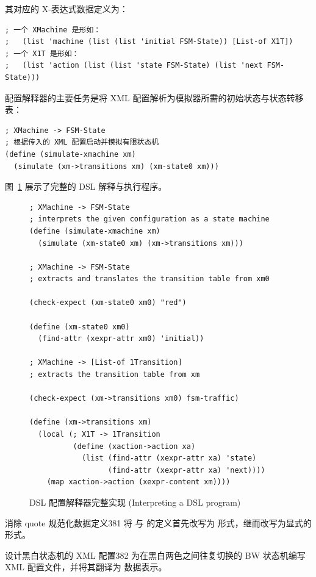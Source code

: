 其对应的 X-表达式数据定义为：
\begin{lstlisting}[language=BSL]
; 一个 XMachine 是形如：
;   (list 'machine (list (list 'initial FSM-State)) [List-of X1T])
; 一个 X1T 是形如：
;   (list 'action (list (list 'state FSM-State) (list 'next FSM-State)))
\end{lstlisting}

配置解释器的主要任务是将 XML 配置解析为模拟器所需的初始状态与状态转移表：
\begin{lstlisting}[language=BSL]
; XMachine -> FSM-State
; 根据传入的 XML 配置启动并模拟有限状态机
(define (simulate-xmachine xm)
  (simulate (xm->transitions xm) (xm-state0 xm)))
\end{lstlisting}

图~\ref{fig:130} 展示了完整的 DSL 解释与执行程序。

\begin{figure}[htbp]
  \centering
\begin{lstlisting}[language=BSL, basicstyle=\scriptsize\ttfamily]
; XMachine -> FSM-State
; interprets the given configuration as a state machine
(define (simulate-xmachine xm)
  (simulate (xm-state0 xm) (xm->transitions xm)))

; XMachine -> FSM-State
; extracts and translates the transition table from xm0

(check-expect (xm-state0 xm0) "red")

(define (xm-state0 xm0)
  (find-attr (xexpr-attr xm0) 'initial))

; XMachine -> [List-of 1Transition]
; extracts the transition table from xm

(check-expect (xm->transitions xm0) fsm-traffic)

(define (xm->transitions xm)
  (local (; X1T -> 1Transition
          (define (xaction->action xa)
            (list (find-attr (xexpr-attr xa) 'state)
                  (find-attr (xexpr-attr xa) 'next))))
    (map xaction->action (xexpr-content xm))))
\end{lstlisting}
  \caption{DSL 配置解释器完整实现 (Interpreting a DSL program)}
  \label{fig:130}
\end{figure}

\begin{exercise}{消除 quote 规范化数据定义}{381}
将  与  的定义首先改写为  形式，继而改写为显式的  形式。
\end{exercise}

\begin{exercise}{设计黑白状态机的 XML 配置}{382}
为在黑白两色之间往复切换的 BW 状态机编写 XML 配置文件，并将其翻译为  数据表示。
\end{exercise}

